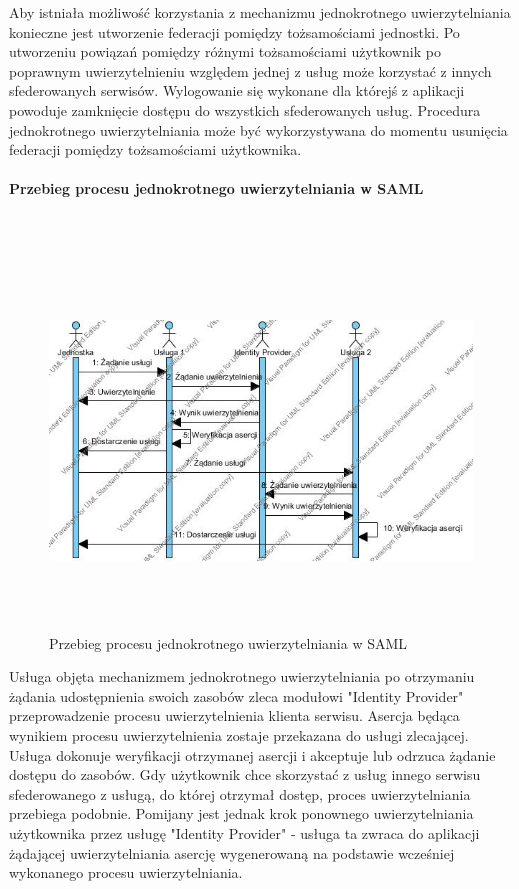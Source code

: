 			Aby istniała możliwość korzystania z mechanizmu jednokrotnego uwierzytelniania konieczne jest utworzenie federacji pomiędzy tożsamościami jednostki. Po utworzeniu powiązań pomiędzy różnymi tożsamościami użytkownik po poprawnym uwierzytelnieniu względem jednej z usług może korzystać z innych sfederowanych serwisów. Wylogowanie się wykonane dla którejś z aplikacji powoduje zamknięcie dostępu do wszystkich sfederowanych usług. Procedura jednokrotnego uwierzytelniania może być wykorzystywana do momentu usunięcia federacji pomiędzy tożsamościami użytkownika.

		\paragraph{Przebieg procesu jednokrotnego uwierzytelniania w SAML}\mbox{}\\

			\begin{figure}[h]
				\centering
					\includegraphics[width=15cm,height=10cm]{img/ssoSteps.jpg}
				\caption{Przebieg procesu jednokrotnego uwierzytelniania w SAML}
				\label{Przebieg procesu jednokrotnego uwierzytelniania w SAML}
			\end{figure}

			Usługa objęta mechanizmem jednokrotnego uwierzytelniania po otrzymaniu żądania udostępnienia swoich zasobów zleca modułowi "Identity Provider" przeprowadzenie procesu uwierzytelnienia klienta serwisu. Asercja będąca wynikiem procesu uwierzytelnienia zostaje przekazana do usługi zlecającej. Usługa dokonuje weryfikacji otrzymanej asercji i akceptuje lub odrzuca żądanie dostępu do zasobów. Gdy użytkownik chce skorzystać z usług innego serwisu sfederowanego z usługą, do której otrzymał dostęp, proces uwierzytelniania przebiega podobnie. Pomijany jest jednak krok ponownego uwierzytelniania użytkownika przez usługę "Identity Provider" - usługa ta zwraca do aplikacji żądającej uwierzytelniania asercję wygenerowaną na podstawie wcześniej wykonanego procesu uwierzytelniania.	
			
